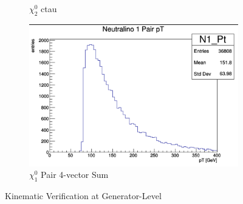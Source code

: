 \documentclass{article}
\begin{document}
\begin{figure} [H]
\begin{subfigure}{.5\textwidth}
  \caption{$\chi_{2}^{0}$ ctau}
  \label{fig:sub-third}
\end{subfigure}
\begin{subfigure}{.5\textwidth}
  \centering
  \includegraphics[width=.8\linewidth]{N1pT.png}  
  \caption{$\chi_{1}^{0}$ Pair 4-vector Sum}
  \label{fig:sub-fourth}
\end{subfigure}
\caption{Kinematic Verification at Generator-Level}
\label{fig:9}
\end{figure}
\end{document}
